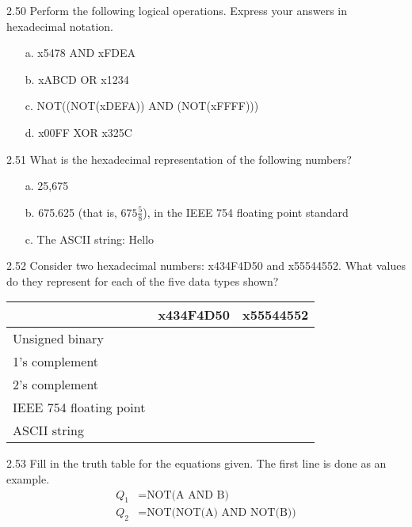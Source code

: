 \documentclass{patt}
\begin{document}
\begin{exercises}
\smallskip

\item[2.50] Perform the following logical operations. Express
your answers in hexadecimal notation.
\begin{enumerate}
\item[a.] x5478 AND xFDEA
\item[b.] xABCD OR x1234
\item[c.] NOT((NOT(xDEFA)) AND (NOT(xFFFF)))
\item[d.] x00FF XOR x325C
\end{enumerate}

\pagebreak

\item[2.51] What is the hexadecimal representation of the following numbers?
\begin{enumerate}[c.]
\item[a.] 25,675
\item[b.] 675.625 (that is, $675\tfrac{5}{8}$), in the IEEE
754 floating point standard
\item[c.] The ASCII string: Hello
\end{enumerate}

\item[2.52] Consider two hexadecimal numbers: x434F4D50 and x55544552.
  What values do they represent for each of the five data types shown?

\begin{center}
\begin{tabular}{|l|c|c|}
\hline
\rule{0pt}{10pt}& x434F4D50 & x55544552\\\hline
Unsigned binary & \rule{0pt}{10pt} & \\\hline
1's complement & \rule{0pt}{10pt} &\\\hline
2's complement & \rule{0pt}{10pt} &\\\hline
IEEE 754 floating point & \rule{0pt}{10pt} &\\\hline
ASCII string & \rule{0pt}{10pt} & \\
\hline
\end{tabular}
\smallskip
\end{center}

\item[2.53] Fill in the truth table for the equations given.
The first line is done as an example.
\begin{align*}
Q_{1} &= \text{NOT(A AND B)}\\
Q_2 &= \text{NOT(NOT(A) AND NOT(B))}
\end{align*}


\end{exercises}
\end{document}
